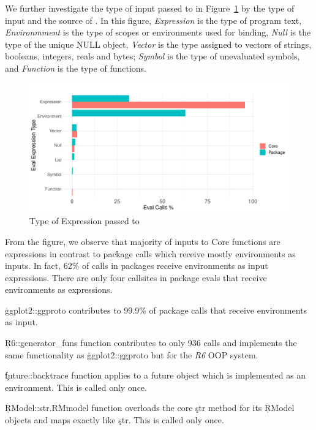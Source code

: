 \documentclass[conference]{IEEEtran}
\newcommand{\PackageEnvironmentInputEvalCallPerc}{62\%\xspace}
\begin{document}
We further investigate the type of input passed to \eval in
Figure~\ref{fig:eval-expression-kind} by the type of input and the source of
\eval. In this figure, \emph{Expression} is the type of program text,
\emph{Environmment} is the type of scopes or environments used for binding,
\emph{Null} is the type of the unique \c{NULL} object, \emph{Vector} is the
type assigned to vectors of strings, booleans, integers, reals and bytes;
\emph{Symbol} is the type of unevaluated symbols, and \emph{Function} is the
type of functions.

\begin{figure}[!h]
  \centering
  \includegraphics[width=\columnwidth]{eval-expression-kind}
  \caption{Type of Expression passed to \eval} \label{fig:eval-expression-kind}
\end{figure}

From the figure, we observe that majority of inputs to Core \eval functions
are expressions in contrast to package \eval calls which receive mostly
environments as inputs. In fact, \PackageEnvironmentInputEvalCallPerc of
\eval calls in packages receive environments as input expressions. There are
only four callsites in package evals that receive environments as
expressions.
\begin{compactitem}[$-$]
\item \c{ggplot2::ggproto} contributes to 99.9\% of package \eval calls that
  receive environments as input.
\item \c{R6::generator_funs} function contributes to only 936 \eval calls and
implements the same functionality as \c{ggplot2::ggproto} but for the \emph{R6}
OOP system.
\item \c{future::backtrace} function applies \eval to a future object which
  is implemented as an environment. This is called only once.
\item \c{RModel::str.RMmodel} function overloads the core \c{str} method for its
\c{RModel} objects and maps \eval exactly like \c{str}. This is called only
once.
\end{compactitem}
\end{document}
